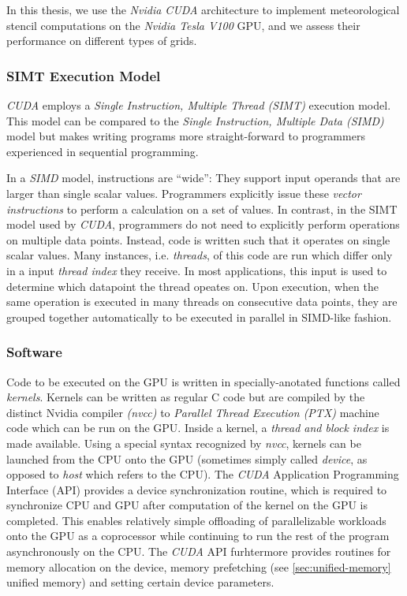 In this thesis, we use the \emph{Nvidia CUDA} architecture to implement meteorological stencil computations on the \emph{Nvidia Tesla V100} GPU, and we assess their performance on different types of grids.

\subsubsection{SIMT Execution Model}

\emph{CUDA} employs a \emph{Single Instruction, Multiple Thread (SIMT)} execution model. This model can be compared to the \emph{Single Instruction, Multiple Data (SIMD)} model but makes writing programs more straight-forward to programmers experienced in sequential programming.\cite[Section~3.1]{ptx-isa} 

In a \emph{SIMD} model, instructions are ``wide'': They support input operands that are larger than single scalar values. Programmers explicitly issue these \emph{vector instructions} to perform a calculation on a set of values. In contrast, in the SIMT model used by \emph{CUDA}, programmers do not need to explicitly perform operations on multiple data points. Instead, code is written such that it operates on single scalar values. Many instances, i.e. \emph{threads}, of this code are run which differ only in a input \emph{thread index} they receive. In most applications, this input is used to determine which datapoint the thread opeates on. Upon execution, when the same operation is executed in many threads on consecutive data points, they are grouped together automatically to be executed in parallel in SIMD-like fashion.

\subsubsection{Software}

Code to be executed on the GPU is written in specially-anotated functions called \emph{kernels}. Kernels can be written as regular C code but are compiled by the distinct Nvidia compiler \emph{(nvcc)} to \emph{Parallel Thread Execution (PTX)} machine code which can be run on the GPU. Inside a kernel, a \emph{thread and block index} is made available. Using a special syntax recognized by \emph{nvcc}, kernels can be launched from the CPU onto the GPU (sometimes simply called \emph{device}, as opposed to \emph{host} which refers to the CPU). The \emph{CUDA} Application Programming Interface (API) provides a device synchronization routine, which is required to synchronize CPU and GPU after computation of the kernel on the GPU is completed. This enables relatively simple offloading of parallelizable workloads onto the GPU as a coprocessor while continuing to run the rest of the program asynchronously on the CPU. The \emph{CUDA} API furhtermore provides routines for memory allocation on the device, memory prefetching (see \ref{sec:unified-memory} unified memory) and setting certain device parameters.

